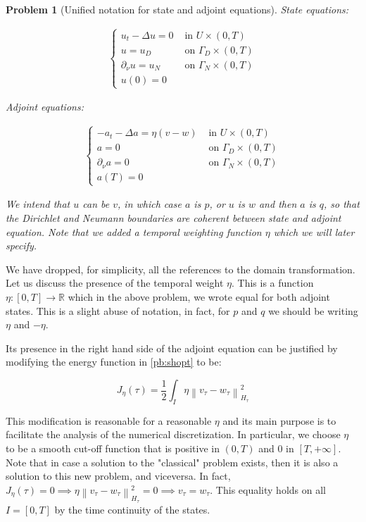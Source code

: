 \documentclass[english,a4paper,9pt,oneside]{scrbook}	%
\theoremstyle{break}
\newtheorem{pb}[equation]{Problem}
\theoremstyle{remark}
\newcommand{\mR}{\mathbb{R}}
\newcommand{\norm}[1]{\left\lVert#1\right\rVert}
\begin{document}
\begin{pb}[Unified notation for state and adjoint equations]
\label{pb:uni_state_adj}
State equations:

\begin{align*}
\left\{\begin{matrix}
u_t-\Delta u =0 & \text{ in } U\times (0,T)\\ 
u = u_D & \text{ on } \Gamma_D\times(0,T)\\ 
\partial_\nu u = u_N & \text{ on } \Gamma_N\times(0,T)\\ 
u(0) =0 & 
\end{matrix}\right.
\end{align*}

Adjoint equations:

\begin{align*}
\left\{\begin{matrix}
-a_t-\Delta a =\eta (v-w) & \text{ in } U\times (0,T)\\ 
a = 0 & \text{ on } \Gamma_D\times(0,T)\\ 
\partial_\nu a = 0 & \text{ on } \Gamma_N\times(0,T)\\ 
a(T) =0 & 
\end{matrix}\right.
\end{align*}

We intend that $u$ can be $v$, in which case $a$ is $p$, or $u$ is $w$ and then $a$ is $q$, so that the Dirichlet and Neumann boundaries are coherent between state and adjoint equation. Note that we added a temporal weighting function $\eta$ which we will later specify.

\end{pb}

We have dropped, for simplicity, all the references to the domain transformation. Let us discuss the presence of the temporal weight $\eta$. This is a function $\eta: [0,T] \rightarrow \mR$ which in the above problem, we wrote equal for both adjoint states. This is a slight abuse of notation, in fact, for $p$ and $q$ we should be writing $\eta$ and $-\eta$.

Its presence in the right hand side of the adjoint equation can be justified by modifying the energy function in \cref{pb:shopt} to be:

$$J_\eta(\tau) = \frac{1}{2} \int_I \eta \norm{v_\tau - w_\tau}_{H_\tau}^2$$

This modification is reasonable for a reasonable $\eta$ and its main purpose is to facilitate the analysis of the numerical discretization. In particular, we choose $\eta$ to be a smooth cut-off function that is positive in $(0,T)$ and $0$ in $[T, +\infty]$. Note that in case a solution to the "classical" problem exists, then it is also a solution to this new problem, and viceversa. In fact, $J_\eta(\tau)=0 \implies \eta \norm{v_\tau - w_\tau}_{H_\tau}^2=0 \implies v_\tau = w_\tau$. This equality holds on all $I=[0,T]$ by the time continuity of the states.
\end{document}
